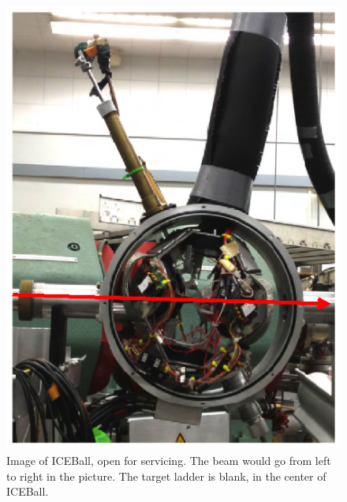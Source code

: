\begin{figure}
    \centering
    \includegraphics[scale=0.8]{Setup_Figs/Open_ICEBall.eps}  
    \caption{Image of ICEBall, open for servicing. The beam would go from left to right in the picture. The target ladder is blank, in the center of ICEBall.}
    \label{fig:open_iceball}
\end{figure}